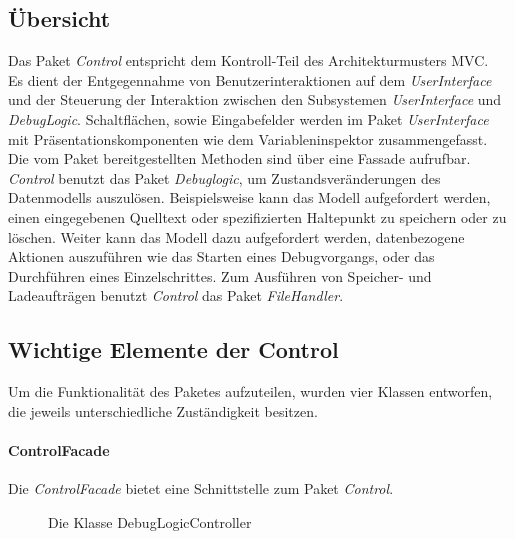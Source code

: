 \documentclass[parskip=full]{scrartcl}
\begin{document}
\subsection{Übersicht}
    Das Paket \textit{Control} entspricht dem Kontroll-Teil des Architekturmusters MVC.\\
    Es dient der Entgegennahme von Benutzerinteraktionen auf dem \textit{UserInterface} und der Steuerung der Interaktion zwischen den Subsystemen \textit{UserInterface} und \textit{DebugLogic}.
    Schaltflächen, sowie Eingabefelder werden im Paket \textit{UserInterface} mit Präsentationskomponenten wie dem Variableninspektor zusammengefasst.\\
    Die vom Paket bereitgestellten Methoden sind über eine Fassade aufrufbar.\\
    \textit{Control} benutzt das Paket \textit{Debuglogic}, um Zustandsveränderungen des Datenmodells auszulösen.
    Beispielsweise kann das Modell aufgefordert werden, einen eingegebenen Quelltext oder spezifizierten Haltepunkt zu speichern oder zu löschen. 
    Weiter kann das Modell dazu aufgefordert werden, datenbezogene Aktionen auszuführen wie das Starten eines Debugvorgangs, oder das Durchführen eines Einzelschrittes. 
    Zum Ausführen von Speicher- und Ladeaufträgen benutzt \textit{Control} das Paket \textit{FileHandler}.
\subsection{Wichtige Elemente der Control}
    Um die Funktionalität des Paketes aufzuteilen, wurden vier Klassen entworfen, die jeweils unterschiedliche Zuständigkeit besitzen.
\paragraph{ControlFacade}
    Die \textit{ControlFacade} bietet eine Schnittstelle zum Paket \textit{Control}.

\begin{figure}[!h]
    \caption{Die Klasse DebugLogicController}
    \label{fig:DebugLogicController}
\end{figure}
\end{document}

